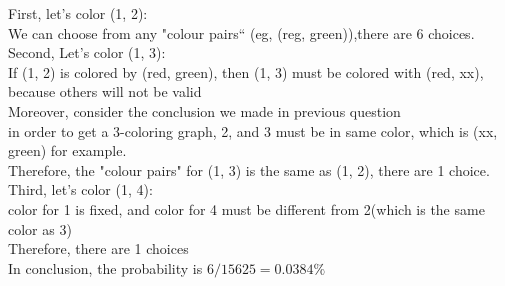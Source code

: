 \documentclass[11pt, a4paper]{article}
\begin{document}
\begin{enumerate}[(a)]
    First, let's color (1, 2):\\
    We can choose from any "colour pairs“ (eg, (reg, green)),there are 6 choices.\\
    Second, Let's color (1, 3):\\
    If (1, 2) is colored by (red, green), then (1, 3) must be colored with (red, xx), because others will not be valid\\
    Moreover, consider the conclusion we made in previous question\\
    in order to get a 3-coloring graph, 2, and 3 must be in same color, which is (xx, green) for example.\\
    Therefore, the "colour pairs" for (1, 3) is the same as (1, 2), there are 1 choice.\\
    Third, let's color (1, 4):\\
    color for 1 is fixed, and color for 4 must be different from 2(which is the same color as 3)\\
    Therefore, there are 1 choices\\
    In conclusion, the probability is $ 6/15625 = 0.0384\% $
\end{enumerate}
\end{document}
